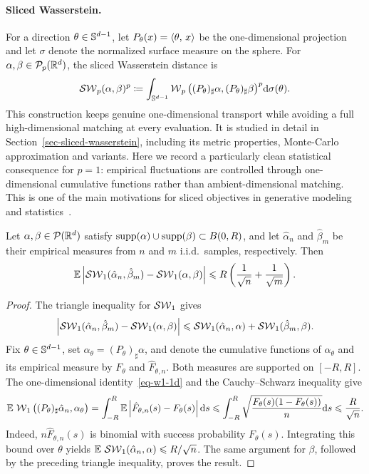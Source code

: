 \paragraph{Sliced Wasserstein.}
For a direction \(\theta\in\mathbb{S}^{d-1}\), let \(P_\theta(x)=\langle \theta,\,x\rangle\) be the one-dimensional projection and let \(\sigma\) denote the normalized surface measure on the sphere. For \(\alpha,\beta\in\mathcal{P}_p(\mathbb{R}^d)\), the sliced Wasserstein distance is
\[
	\operatorname{\mathcal{SW}}_p(\alpha,\beta)^p
	\coloneqq
	\int_{\mathbb{S}^{d-1}}
	\operatorname{\mathcal{W}}_p\big((P_\theta)_\sharp\alpha,(P_\theta)_\sharp\beta\big)^p
	\mathrm{d}\sigma(\theta).
\]
This construction keeps genuine one-dimensional transport while avoiding a full high-dimensional matching at every evaluation. It is studied in detail in Section~\ref{sec-sliced-wasserstein}, including its metric properties, Monte-Carlo approximation and variants. Here we record a particularly clean statistical consequence for \(p=1\): empirical fluctuations are controlled through one-dimensional cumulative functions rather than ambient-dimensional matching. This is one of the main motivations for sliced objectives in generative modeling and statistics~\cite{nadjahi2019asymptotic,nadjahi2020statistical,manole2019minimax}.
\begin{thm}\label{thm-sliced-sample-complexity}
	Let \(\alpha,\beta\in\mathcal{P}(\mathbb{R}^d)\) satisfy
	\(\operatorname{supp}(\alpha)\cup\operatorname{supp}(\beta)\subset B(0,R)\), and let
	\(\hat\alpha_n\) and \(\hat\beta_m\) be their empirical measures from \(n\) and \(m\) i.i.d.\ samples, respectively. Then
	\[
		\mathbb{E}\left\lvert\operatorname{\mathcal{SW}}_1(\hat\alpha_n,\hat\beta_m)-\operatorname{\mathcal{SW}}_1(\alpha,\beta)\right\rvert
		\leqslant
		R\left(\frac{1}{\sqrt n}+\frac{1}{\sqrt m}\right).
	\]
\end{thm}

\begin{proof}
	The triangle inequality for \(\operatorname{\mathcal{SW}}_1\) gives
	\[
		\left\lvert\operatorname{\mathcal{SW}}_1(\hat\alpha_n,\hat\beta_m)-\operatorname{\mathcal{SW}}_1(\alpha,\beta)\right\rvert
		\leqslant
		\operatorname{\mathcal{SW}}_1(\hat\alpha_n,\alpha)+\operatorname{\mathcal{SW}}_1(\hat\beta_m,\beta).
	\]
	Fix \(\theta\in\mathbb{S}^{d-1}\), set \(\alpha_\theta=(P_\theta)_\sharp\alpha\), and denote the cumulative functions of \(\alpha_\theta\) and its empirical measure by \(F_\theta\) and \(\hat F_{\theta,n}\). Both measures are supported on \([-R,R]\). The one-dimensional identity~\eqref{eq-w1-1d} and the Cauchy--Schwarz inequality give
	\[
		\mathbb{E}\,\operatorname{\mathcal{W}}_1\big((P_\theta)_\sharp\hat\alpha_n,\alpha_\theta\big)
		=
		\int_{-R}^R \mathbb{E}\left\lvert\hat F_{\theta,n}(s)-F_\theta(s)\right\rvert\mathrm{d} s
		\leqslant
		\int_{-R}^R \sqrt{\frac{F_\theta(s)(1-F_\theta(s))}{n}}\mathrm{d} s
		\leqslant
		\frac{R}{\sqrt n}.
	\]
	Indeed, \(n\hat F_{\theta,n}(s)\) is binomial with success probability \(F_\theta(s)\). Integrating this bound over \(\theta\) yields \(\mathbb{E}\,\operatorname{\mathcal{SW}}_1(\hat\alpha_n,\alpha)\leqslant R/\sqrt n\). The same argument for \(\beta\), followed by the preceding triangle inequality, proves the result.
\end{proof}

